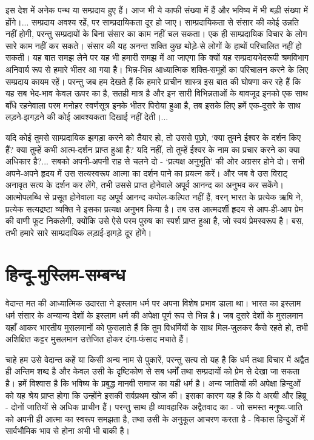 इस देश में अनेक पन्थ या सम्प्रदाय हुए हैं। आज भी ये काफी संख्या में हैं और भविष्य में भी बड़ी संख्या में होंगे।... सम्प्रदाय अवश्य रहें, पर साम्प्रदायिकता दूर हो जाए। साम्प्रदायिकता से संसार की कोई उन्नति नहीं होगी, परन्तु सम्प्रदायों के बिना संसार का काम नहीं चल सकता। एक ही साम्प्रदायिक विचार के लोग सारे काम नहीं कर सकते। संसार की यह अनन्त शक्ति कुछ थोड़े-से लोगों के हाथों परिचालित नहीं हो सकती। यह बात समझ लेने पर यह भी हमारी समझ में आ जाएगा कि क्यों यह सम्प्रदायभेदरूपी श्रमविभाग अनिवार्य रूप से हमारे भीतर आ गया है। भिन्न-भिन्न आध्यात्मिक शक्ति-समूहों का परिचालन करने के लिए सम्प्रदाय कायम रहें। परन्तु जब हम देखते हैं कि हमारे प्राचीन शास्त्र इस बात की घोषणा कर रहे हैं कि यह सब भेद-भाव केवल ऊपर का है, सतही मात्र है और इन सारी विभिन्नताओं के बावजूद इनको एक साथ बाँधे रहनेवाला परम मनोहर स्वर्णसूत्र इनके भीतर पिरोया हुआ है, तब इसके लिए हमें एक-दूसरे के साथ लड़ने-झगड़ने की कोई आवश्यकता दिखाई नहीं देती।... 

यदि कोई तुमसे साम्प्रदायिक झगड़ा करने को तैयार हो, तो उससे पूछो, ‘क्या तुमने ईश्वर के दर्शन किए हैं? क्या तुम्हें कभी आत्म-दर्शन प्राप्त हुआ है? यदि नहीं, तो तुम्हें ईश्वर के नाम का प्रचार करने का क्या अधिकार है?... सबको अपनी-अपनी राह से चलने दो - ‘प्रत्यक्ष अनुभूति’ की ओर अग्रसर होने दो। सभी अपने-अपने हृदय में उस सत्यस्वरूप आत्मा का दर्शन पाने का प्रयत्न करें। और जब वे उस विराट् अनावृत सत्य के दर्शन कर लेंगे, तभी उससे प्राप्त होनेवाले अपूर्व आनन्द का अनुभव कर सकेंगे। आत्मोपलब्धि से प्रसूत होनेवाला यह अपूर्व आनन्द कपोल-कल्पित नहीं हैं, वरन् भारत के प्रत्येक ऋषि ने, प्रत्येक सत्यद्रष्टा व्यक्ति ने इसका प्रत्यक्ष अनुभव किया है। तब उस आत्मदर्शी हृदय से आप-ही-आप प्रेम की वाणी फूट निकलेगी, क्योंकि उसे ऐसे परम पुरुष का स्पर्श प्राप्त हुआ है, जो स्वयं प्रेमस्वरूप है। बस, तभी हमारे सारे साम्प्रदायिक लड़ाई-झगड़े दूर होंगे।\endnotemark[\theendnote]


\section*{हिन्दू-मुस्लिम-सम्बन्ध}


वेदान्त मत की आध्यात्मिक उदारता ने इस्लाम धर्म पर अपना विशेष प्रभाव डाला था। भारत का इस्लाम धर्म संसार के अन्यान्य देशों के इस्लाम धर्म की अपेक्षा पूर्ण रूप से भिन्न है। जब दूसरे देशों के मुसलमान यहाँ आकर भारतीय मुसलमानों को फुसलाते हैं कि तुम विधर्मियों के साथ मिल-जुलकर कैसे रहते हो, तभी अशिक्षित कट्टर मुसलमान उत्तेजित होकर दंगा-फंसाद मचाते हैं। 

चाहे हम उसे वेदान्त कहें या किसी अन्य नाम से पुकारें, परन्तु सत्य तो यह है कि धर्म तथा विचार में अद्वैत ही अन्तिम शब्द है और केवल उसी के दृष्टिकोण से सब धर्मों तथा सम्प्रदायों को प्रेम से देखा जा सकता है। हमें विश्वास है कि भविष्य के प्रबुद्ध मानवी समाज का यही धर्म है। अन्य जातियों की अपेक्षा हिन्दुओं को यह श्रेय प्राप्त होगा कि उन्होंने इसकी सर्वप्रथम खोज की। इसका कारण यह है कि वे अरबी और हिब्रू - दोनों जातियों से अधिक प्राचीन हैं। परन्तु साथ ही व्यावहारिक अद्वैतवाद का - जो समस्त मनुष्य-जाति को अपनी ही आत्मा का स्वरूप समझता है, तथा उसी के अनुकूल आचरण करता है - विकास हिन्दुओं में सार्वभौमिक भाव से होना अभी भी बाकी है। 

